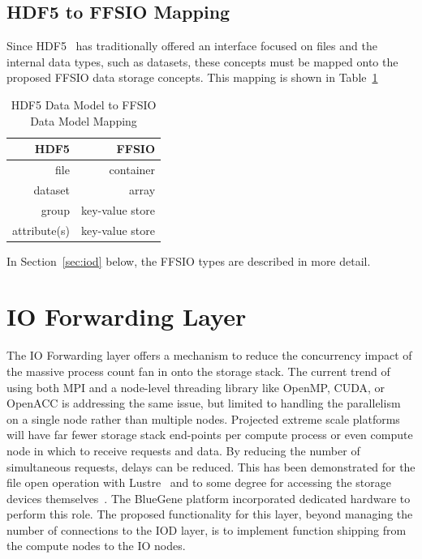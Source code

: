 \documentclass[conference]{IEEEtran} \pdfpagewidth=8.5in
\begin{document}
\subsection{HDF5 to FFSIO Mapping}
\label{sec:hdf-to-ffsio}

Since HDF5~\cite{hdf5} has traditionally offered an interface focused on files and the
internal data types, such as datasets, these concepts must be mapped onto the
proposed FFSIO data storage concepts.  This mapping is shown in
Table~\ref{tab:mapping}

\begin{table}[ht]
    \centering
    \caption[HDF5 to FFSIO Mapping]{HDF5 Data Model to FFSIO Data Model Mapping}
    \bigskip
    \begin{tabular}{|r|r|}
\hline
HDF5 & FFSIO\\
\hline
file & container \\
dataset & array \\
group & key-value store \\
attribute(s) & key-value store \\
\hline
    \end{tabular}
    \label{tab:mapping}
\end{table}

In Section~\ref{sec:iod} below, the FFSIO types are described in more detail.

\section{IO Forwarding Layer}
\label{sec:iof}

The IO Forwarding layer offers a mechanism to reduce the concurrency impact of
the massive process count fan in onto the storage stack. The current trend of
using both MPI and a node-level threading library like OpenMP, CUDA, or OpenACC
is addressing the same issue, but limited to handling the parallelism on a
single node rather than multiple nodes. Projected extreme scale platforms will
have far fewer storage stack end-points per compute process or even compute
node in which to receive requests and data. By reducing the number of
simultaneous requests, delays can be reduced. This has been demonstrated for
the file open operation with Lustre~\cite{lofstead:2009:adaptable} and to some
degree for accessing the storage devices
themselves~\cite{lofstead:2010:io-variability}.  The BlueGene platform
incorporated dedicated hardware to perform this role. The proposed
functionality for this layer, beyond managing the number of connections to the
IOD layer, is to implement function shipping from the compute nodes to the IO
nodes.
\end{document}
